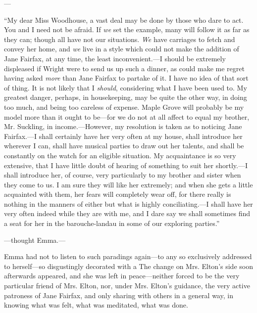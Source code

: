 ---

“My dear Miss Woodhouse, a vast deal may be done by those who dare to act. You and I need not be afraid. If {\em we} set the example, many will follow it as far as they can; though all have not our situations. {\em We} have carriages to fetch and convey her home, and {\em we} live in a style which could not make the addition of Jane Fairfax, at any time, the least inconvenient.---I should be extremely displeased if Wright were to send us up such a dinner, as could make me regret having asked {\em more} than Jane Fairfax to partake of it. I have no idea of that sort of thing. It is not likely that I {\em should}, considering what I have been used to. My greatest danger, perhaps, in housekeeping, may be quite the other way, in doing too much, and being too careless of expense. Maple Grove will probably be my model more than it ought to be---for we do not at all affect to equal my brother, Mr. Suckling, in income.---However, my resolution is taken as to noticing Jane Fairfax.---I shall certainly have her very often at my house, shall introduce her wherever I can, shall have musical parties to draw out her talents, and shall be constantly on the watch for an eligible situation. My acquaintance is so very extensive, that I have little doubt of hearing of something to suit her shortly.---I shall introduce her, of course, very particularly to my brother and sister when they come to us. I am sure they will like her extremely; and when she gets a little acquainted with them, her fears will completely wear off, for there really is nothing in the manners of either but what is highly conciliating.---I shall have her very often indeed while they are with me, and I dare say we shall sometimes find a seat for her in the barouche-landau in some of our exploring parties.”

---thought Emma.---

Emma had not to listen to such paradings again---to any so exclusively addressed to herself---so disgustingly decorated with a  The change on Mrs. Elton's side soon afterwards appeared, and she was left in peace---neither forced to be the very particular friend of Mrs. Elton, nor, under Mrs. Elton's guidance, the very active patroness of Jane Fairfax, and only sharing with others in a general way, in knowing what was felt, what was meditated, what was done.


